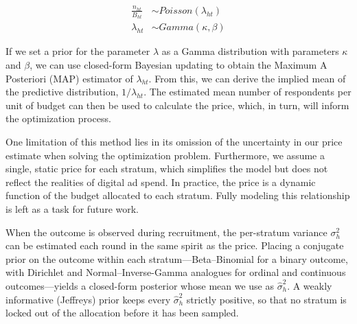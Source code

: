 \documentclass[letterpaper,12pt]{article}
\theoremstyle{proposition}
\begin{document}
\begin{align*}
\frac{n_{ht}}{ B_{ht}} &\sim Poisson(\lambda_{ht}) \\
\lambda_{ht} &\sim Gamma(\kappa, \beta)
\end{align*}

If we set a prior for the parameter \(\lambda\) as a Gamma distribution with parameters \(\kappa\) and \(\beta\), we can use closed-form Bayesian updating to obtain the Maximum A Posteriori (MAP) estimator of \(\lambda_{ht}\). From this, we can derive the implied mean of the predictive distribution, \(1 / \lambda_{ht}\). The estimated mean number of respondents per unit of budget can then be used to calculate the price, which, in turn, will inform the optimization process.


One limitation of this method lies in its omission of the uncertainty in our price estimate when solving the optimization problem. Furthermore, we assume a single, static price for each stratum, which simplifies the model but does not reflect the realities of digital ad spend. In practice, the price is a dynamic function of the budget allocated to each stratum. Fully modeling this relationship is left as a task for future work.


When the outcome is observed during recruitment, the per-stratum variance $\sigma_h^2$ can be estimated each round in the same spirit as the price. Placing a conjugate prior on the outcome within each stratum---Beta--Binomial for a binary outcome, with Dirichlet and Normal--Inverse-Gamma analogues for ordinal and continuous outcomes---yields a closed-form posterior whose mean we use as $\hat\sigma_h^2$. A weakly informative (Jeffreys) prior keeps every $\hat\sigma_h^2$ strictly positive, so that no stratum is locked out of the allocation before it has been sampled.
\end{document}

